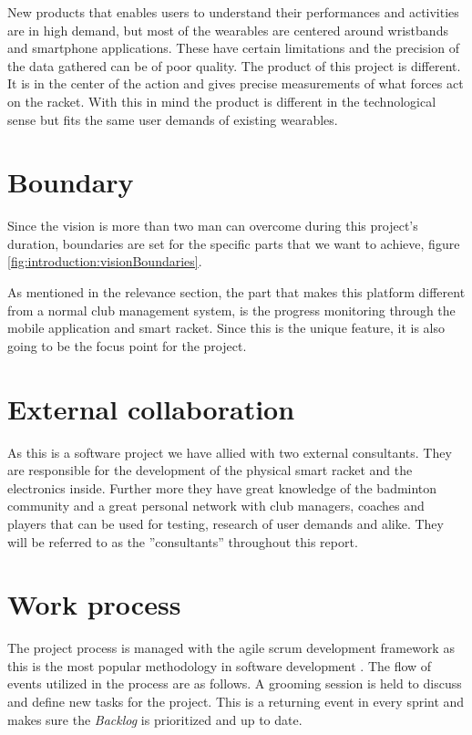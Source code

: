 New products that enables users to understand their performances and activities are in high demand, but most of the wearables are centered around wristbands and smartphone applications.
These have certain limitations and the precision of the data gathered can be of poor quality.
The product of this project is different.
It is in the center of the action and gives precise measurements of what forces act on the racket.
With this in mind the product is different in the technological sense but fits the same user demands of existing wearables.

\section*{Boundary}
Since the vision is more than two man can overcome during this project's duration, boundaries are set for the specific parts that we want to achieve, figure \ref{fig:introduction:visionBoundaries}.

As mentioned in the relevance section, the part that makes this platform different from a normal club management system, is the progress monitoring through the mobile application and smart racket.
Since this is the unique feature, it is also going to be the focus point for the project.


\section*{External collaboration}
As this is a software project we have allied with two external consultants.
They are responsible for the development of the physical smart racket and the electronics inside.
Further more they have great knowledge of the badminton community and a great personal network with club managers, coaches and players that can be used for testing, research of user demands and alike.
They will be referred to as the ''consultants'' throughout this report.

\section*{Work process}
The project process is managed with the agile \gls{scrum} development framework as this is the most popular methodology in software development \citep{introduction:work:scrum}. 
The flow of events utilized in the process are as follows.
A grooming session is held to discuss and define new tasks for the project.
This is a returning event in every sprint and makes sure the \textit{Backlog} is prioritized and up to date.

